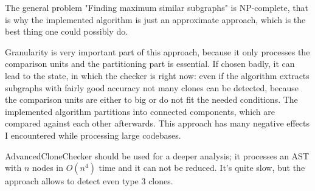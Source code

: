 \documentclass[a0,portrait]{a0poster}
\begin{document}
\begin{multicols}{2}
The general problem "Finding maximum similar subgraphs" is NP-complete, that is why the 
implemented algorithm is just an approximate approach, which is the best thing one could 
possibly do.

Granularity is very important part of this approach, because it only processes the 
comparison units and the partitioning part is essential. If chosen badly, it can lead to 
the state, in which the checker is right now: even if the algorithm extracts subgraphs 
with fairly good accuracy not many clones can be detected, because the comparison units 
are either to big or do not fit the needed conditions. The implemented algorithm 
partitions into connected components, which are compared against each other afterwards. 
This approach has many negative effects I encountered while processing large codebases.

AdvancedCloneChecker should be used for a deeper analysis; it processes an AST with $n$
nodes in $O(n^4)$ time and it can not be reduced. It's quite slow, but the approach
allows to detect even type 3 clones.



\end{multicols}
\end{document}
